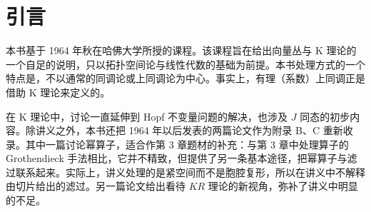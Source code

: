 \chapter*{引言}

本书基于 1964 年秋在哈佛大学所授的课程。该课程旨在给出向量丛与 K 理论的一个自足的说明，只以拓扑空间论与线性代数的基础为前提。本书处理方式的一个特点是，不以通常的同调论或上同调论为中心。事实上，有理（系数）上同调正是借助 K 理论来定义的。

在 K 理论中，讨论一直延伸到 Hopf 不变量问题的解决，也涉及 $J$ 同态的初步内容。除讲义之外，本书还把 1964 年以后发表的两篇论文作为附录 B、C 重新收录。其中一篇讨论幂算子，适合作第 3 章题材的补充：与第 3 章中处理算子的 Grothendieck 手法相比，它并不精致，但提供了另一条基本途径，把幂算子与滤过联系起来。实际上，讲义处理的是紧空间而不是胞腔复形，所以在讲义中不解释由切片给出的滤过。另一篇论文给出看待 $KR$ 理论的新视角，弥补了讲义中明显的不足。

